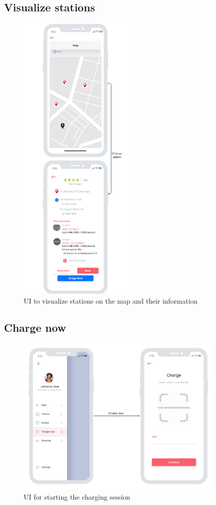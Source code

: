 \subsection{Visualize stations}
\begin{figure}[H]
    \centering
    \includegraphics[width=0.5\textwidth]{Images/cp3/visualizeStations.png}
    \caption{UI to visualize stations on the map and their information}
\end{figure}

\subsection{Charge now}
\begin{figure}[H]
    \centering
    \includegraphics[width=0.9\textwidth]{Images/cp3/chargeNow.png}
    \caption{UI for starting the charging session}
\end{figure}

